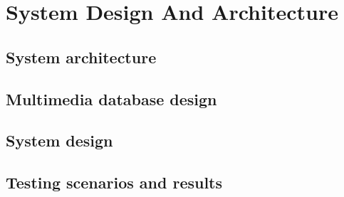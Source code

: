 \chapter{System Design And Architecture}
\section{System architecture}





\section{Multimedia database design}
\section{System design}





\section{Testing scenarios and results}
